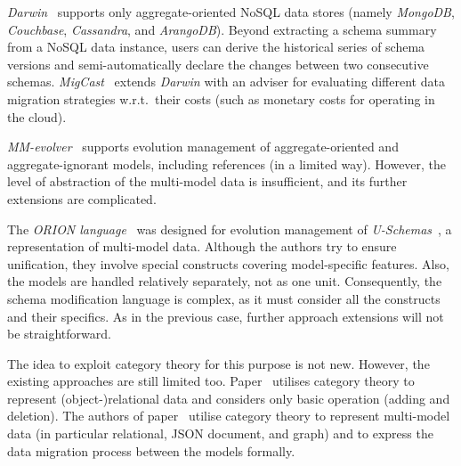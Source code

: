 
\emph{Darwin}~\citep{DBLP:conf/icde/Storl0TTSKS18,darwin-btw17}  supports only aggregate-oriented NoSQL data stores (namely \textit{MongoDB}, \textit{Couchbase}, \textit{Cassandra}, and \textit{ArangoDB}). 
Beyond extracting a schema summary from a NoSQL data instance, users can derive the historical series of schema versions and semi-automatically declare the changes between two consecutive schemas. \emph{MigCast}~\citep{hillenbrand2019migcast,DBLP:conf/icde/HillenbrandSLNK20} extends \emph{Darwin} with 
an adviser for evaluating different data migration strategies w.r.t.\ their costs (such as monetary costs for operating in the cloud).

\textit{MM-evolver}~\citep{DBLP:journals/dke/HolubovaVS21} supports evolution management of aggregate-oriented and aggregate-ignorant models, including references (in a limited way). However, the level of abstraction of the multi-model data is insufficient, and its further extensions are complicated. 


The \textit{ORION language}~\citep{DBLP:conf/er/ChillonRM21a} was designed for evolution management of \textit{U-Schemas}~\citep{DBLP:journals/is/CandelRM22}, a  representation of multi-model data. Although the authors try to ensure unification, they involve special constructs covering model-specific features. Also, the models are handled relatively separately, not as one unit. Consequently, the schema modification language is complex, as it must consider all the constructs and their specifics. As in the previous case, further approach extensions will not be straightforward.


The idea to exploit category theory for this purpose is not new. However, the existing approaches are still limited too. 
Paper~\citep{tuijn1996} utilises category theory to represent (object-)relational data and considers only basic operation (adding and deletion).
The authors of paper~\citep{DBLP:journals/corr/abs-2201-04905} utilise category theory to represent multi-model data (in particular relational, JSON document, and graph) and to express the data migration process between the models formally.


